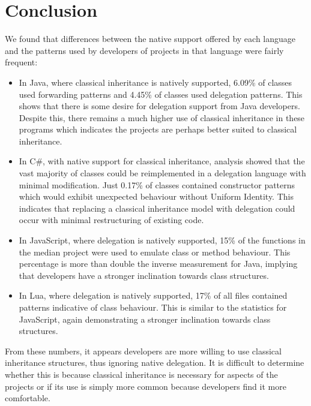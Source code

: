 \chapter{Conclusion}\label{C:con}
We found that differences between the native support offered by each language and the patterns used by developers of projects in that language were fairly frequent:
\begin{itemize}
	\item In Java, where classical inheritance is natively supported, 6.09\% of classes used forwarding patterns and 4.45\% of classes used delegation patterns. This shows that there is some desire for delegation support from Java developers. Despite this, there remains a much higher use of classical inheritance in these programs which indicates the projects are perhaps better suited to classical inheritance.
	
	\item In C\#, with native support for classical inheritance, analysis showed that the vast majority of classes could be reimplemented in a delegation language with minimal modification. Just 0.17\% of classes contained constructor patterns which would exhibit unexpected behaviour without Uniform Identity. This indicates that replacing a classical inheritance model with delegation could occur with minimal restructuring of existing code.
	
	\item In JavaScript, where delegation is natively supported, 15\% of the functions in the median project were used to emulate class or method behaviour. This percentage is more than double the inverse measurement for Java, implying that developers have a stronger inclination towards class structures.
	
	\item In Lua, where delegation is natively supported, 17\% of all files contained patterns indicative of class behaviour. This is similar to the statistics for JavaScript, again demonstrating a stronger inclination towards class structures.
\end{itemize}

From these numbers, it appears developers are more willing to use classical inheritance structures, thus ignoring native delegation. It is difficult to determine whether this is because classical inheritance is necessary for aspects of the projects or if its use is simply more common because developers find it more comfortable.

